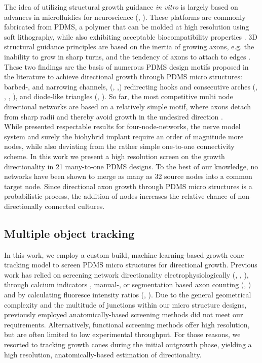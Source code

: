 The idea of utilizing structural growth guidance \textit{in vitro} is largely
based on advances in microfluidics for neuroscience (\cite{microfludics1},
\cite{microfludics2}).  These platforms are commonly fabricated from PDMS, a
polymer that can be molded at high resolution using soft lithography, while also
exhibiting acceptable biocompatibility properties \parencite{pdms}. 3D
structural guidance principles are based on the inertia of growing axons, e.g.
the inability to grow in sharp turns, and the tendency of axons to attach to
edges \parencite{axongrowth3d}. These two findings are the basis of numerous
PDMS design motifs proposed in the literature to achieve directional growth
through PDMS micro structures: barbed-, and narrowing channels, (\cite{lefeber},
\cite{peyrin},) redirecting hooks and consecutive arches (\cite{pirlo},
\cite{na}, \cite{renault}, \cite{2019afterForro}), and diode-like triangles
(\cite{gladkov}, \cite{isomura}). So far, the most competitive multi node
directional networks are based on a relatively simple motif, where axons detach
from sharp radii and thereby avoid growth in the undesired direction
\parencite{forro}. \\

While \cite{forro} presented respectable results for four-node-networks, the
nerve model system and surely the biohybrid implant require an order of
magnitude more nodes, while also deviating from the rather simple one-to-one
connectivity scheme. In this work we present a high resolution screen on the
growth directionality in 21 many-to-one PDMS designs. To the best of our
knowledge, no networks have been shown to merge as many as 32 source nodes into
a common target node. Since directional axon growth through PDMS micro
structures is a probabilistic process, the addition of nodes increases the
relative chance of non-directionally connected cultures. 

\subsection{Multiple object tracking}
In this work, we employ a custom build, machine learning-based growth cone
tracking model to screen PDMS micro structures for directional growth. Previous
work has relied on screening network directionality electrophysiologically
(\cite{forro}, \cite{isomura}, \cite{lefeber}), through calcium indicators
\parencite{na}, manual-, or segmentation based axon counting (\cite{pirlo},
\cite{forro}) and by calculating fluoresce intensity ratios (\cite{renault},
\cite{na}). Due to the general geometrical complexity and the multitude of
junctions within our micro structure designs, previously employed
anatomically-based screening methods did not meet our requirements.
Alternatively, functional screening methods offer high resolution, but are often
limited to low experimental throughput. For those reasons, we resorted to
tracking growth cones during the initial outgrowth phase, yielding a high
resolution, anatomically-based estimation of directionality. \\

